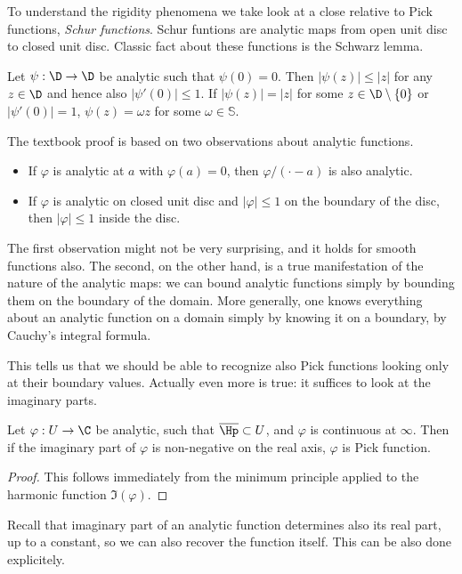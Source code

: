 To understand the rigidity phenomena we take look at a close relative to Pick functions, \textit{Schur functions}. Schur funtions are analytic maps from open unit disc to closed unit disc. Classic fact about these functions is the Schwarz lemma.

\begin{lause}
	Let $\psi : \D \to \D$ be analytic such that $\psi(0) = 0$. Then $|\psi(z)| \leq |z|$ for any $z \in \D$ and hence also $|\psi'(0)| \leq 1$. If $|\psi(z)| = |z|$ for some $z \in \D \setminus \{0\}$ or $|\psi'(0)| = 1$, $\psi(z) = \omega z$ for some $\omega \in \mathbb{S}$.
\end{lause}

The textbook proof is based on two observations about analytic functions.
\begin{itemize}
	\item If $\varphi$ is analytic at $a$ with $\varphi(a) = 0$, then $\varphi/(\cdot - a)$ is also analytic.
	\item If $\varphi$ is analytic on closed unit disc and $|\varphi| \leq 1$ on the boundary of the disc, then $|\varphi| \leq 1$ inside the disc.
\end{itemize}

The first observation might not be very surprising, and it holds for smooth functions also. The second, on the other hand, is a true manifestation of the nature of the analytic maps: we can bound analytic functions simply by bounding them on the boundary of the domain. More generally, one knows everything about an analytic function on a domain simply by knowing it on a boundary, by Cauchy's integral formula.

This tells us that we should be able to recognize also Pick functions looking only at their boundary values. Actually even more is true: it suffices to look at the imaginary parts.

\begin{prop}
	Let $\varphi : U \to \C$ be analytic, such that $\overline{\Hp} \subset U$, and $\varphi$ is continuous at $\infty$. Then if the imaginary part of $\varphi$ is non-negative on the real axis, $\varphi$ is Pick function.
\end{prop}
\begin{proof}
	This follows immediately from the minimum principle applied to the harmonic function $\Im(\varphi)$.
\end{proof}

Recall that imaginary part of an analytic function determines also its real part, up to a constant, so we can also recover the function itself. This can be also done explicitely.

